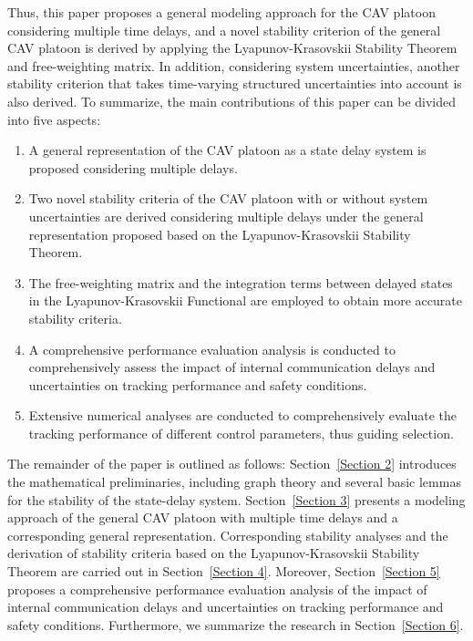 \documentclass[journal]{IEEEtran}
\begin{document}
Thus, this paper proposes a general modeling approach for the CAV platoon considering multiple time delays, and a novel stability criterion of the general CAV platoon is derived by applying the Lyapunov-Krasovskii Stability Theorem and free-weighting matrix. In addition, considering system uncertainties, another stability criterion that takes time-varying structured uncertainties into account is also derived. To summarize, the main contributions of this paper can be divided into five aspects:
\begin{enumerate}
  \item A general representation of the CAV platoon as a state delay system is proposed considering multiple delays.
  \item Two novel stability criteria of the CAV platoon with or without system uncertainties are derived considering multiple delays under the general representation proposed based on the Lyapunov-Krasovskii Stability Theorem.
  \item The free-weighting matrix and the integration terms between delayed states in the Lyapunov-Krasovskii Functional are employed to obtain more accurate stability criteria.
  \item A comprehensive performance evaluation analysis is conducted to comprehensively assess the impact of internal communication delays and uncertainties on tracking performance and safety conditions.
  \item Extensive numerical analyses are conducted to comprehensively evaluate the tracking performance of different control parameters, thus guiding selection.
\end{enumerate}

The remainder of the paper is outlined as follows: Section~\ref{Section 2} introduces the mathematical preliminaries, including graph theory and several basic lemmas for the stability of the state-delay system. Section~\ref{Section 3} presents a modeling approach of the general CAV platoon with multiple time delays and a corresponding general representation. Corresponding stability analyses and the derivation of stability criteria based on the Lyapunov-Krasovskii Stability Theorem are carried out in Section~\ref{Section 4}. Moreover, Section~\ref{Section 5} proposes a comprehensive performance evaluation analysis of the impact of internal communication delays and uncertainties on tracking performance and safety conditions. Furthermore, we summarize the research in Section~\ref{Section 6}.
\end{document}
